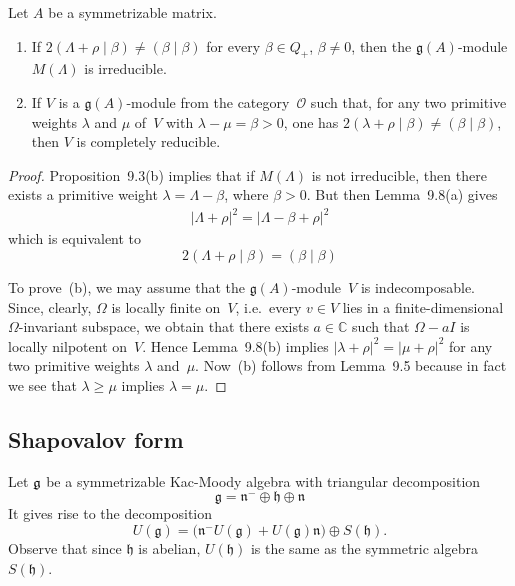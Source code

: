 \documentclass[12pt]{article}
\begin{document}
\begin{proposition}\label{prop:irred-crit}
    Let $A$ be a symmetrizable matrix.
    \begin{enumerate}[label=\textup{(\alph*)}]
        \item
              If $2(\Lambda + \rho \mid \beta) \ne (\beta \mid \beta)$ for every $\beta \in Q_+$, $\beta \ne 0$,
              then the $\mathfrak{g}(A)$-module $M(\Lambda)$ is irreducible.

        \item
              If $V$ is a $\mathfrak{g}(A)$-module from the category~$\mathcal{O}$ such that,
              for any two primitive weights $\lambda$ and $\mu$ of~$V$ with $\lambda - \mu = \beta > 0$,
              one has $2(\lambda + \rho \mid \beta) \ne (\beta \mid \beta)$,
              then $V$ is completely reducible.
    \end{enumerate}

    \begin{proof}
        Proposition~9.3(b) implies that if $M(\Lambda)$ is not irreducible,
        then there exists a primitive weight $\lambda = \Lambda - \beta$, where $\beta > 0$.
        But then Lemma~9.8(a) gives
        \begin{align*}
            |\Lambda + \rho|^2 = |\Lambda - \beta + \rho|^2
        \end{align*}
        which is equivalent to
        \[2(\Lambda + \rho \mid \beta) = (\beta \mid \beta)\]


        To prove~(b), we may assume that the $\mathfrak{g}(A)$-module~$V$ is indecomposable.
        Since, clearly, $\Omega$ is locally finite on~$V$, i.e.\ every $v \in V$
        lies in a finite-dimensional $\Omega$-invariant subspace, we obtain that there exists
        $a \in \mathbb{C}$ such that $\Omega - aI$ is locally nilpotent on~$V$.
        Hence Lemma~9.8(b) implies $|\lambda + \rho|^2 = |\mu + \rho|^2$
        for any two primitive weights $\lambda$ and~$\mu$.
        Now~(b) follows from Lemma~9.5 because in fact we see that $\lambda \ge \mu$ implies $\lambda = \mu$.
    \end{proof}
\end{proposition}


\subsection{Shapovalov form}
Let $\mathfrak{g}$ be a symmetrizable Kac-Moody algebra with triangular decomposition
\[
\mathfrak{g} = \mathfrak{n}^- \oplus \mathfrak{h} \oplus \mathfrak{n}
\]
It gives rise to the decomposition
\begin{equation}
U(\mathfrak{g})
= \bigl(\mathfrak{n}^- U(\mathfrak{g}) + U(\mathfrak{g}) \mathfrak{n}\bigr)
  \oplus S(\mathfrak{h}).
\end{equation}
Observe that since $\mathfrak{h}$ is abelian, $U(\mathfrak{h})$ is the same as the symmetric algebra $S(\mathfrak{h})$.
\end{document}
